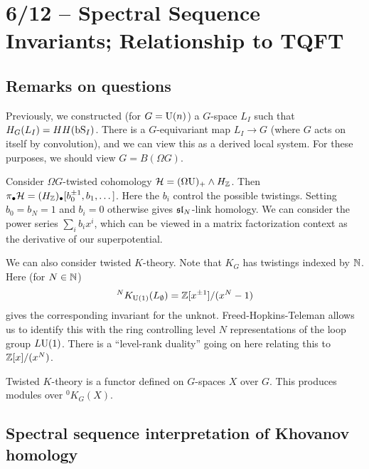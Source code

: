 \section{6/12 -- Spectral Sequence Invariants; Relationship to TQFT}

\subsection{Remarks on questions}

Previously, we constructed (for $G = \mathrm{U}(n)$) a $G$-space $L_I$ such that $H_G(L_I) = HH(\mathrm{bS}_I)$.
There is a $G$-equivariant map $L_I \to G$ (where $G$ acts on itself by convolution), and we can view this as a derived local system.
For these purposes, we should view $G = B(\Omega G)$.

\begin{ex}
	Consider $\Omega G$-twisted cohomology $\mathcal{H} = (\Omega \mathrm{U})_+ \wedge H_{\mathbb{Z}}$.
	Then $\pi_\bullet \mathcal{H} = (H_{\mathbb{Z}})_\bullet [b_0^{\pm 1}, b_1, \dots]$.
	Here the $b_i$ control the possible twistings.
	Setting $b_0 = b_N = 1$ and $b_i = 0$ otherwise gives $\mathfrak{sl}_N$-link homology.
	We can consider the power series $\sum_i b_i x^i$, which can be viewed in a matrix factorization context as the derivative of our superpotential.
\end{ex}

\begin{ex}
	We can also consider twisted $K$-theory.
	Note that $K_G$ has twistings indexed by $\mathbb{N}$.
	Here (for $N \in \mathbb{N}$)
	\[
		{}^N K_{\mathrm{U}(1)}(L_\emptyset) = \mathbb{Z}[x^{\pm 1}] / (x^N - 1)
	\]
	gives the corresponding invariant for the unknot.
	Freed-Hopkins-Teleman allows us to identify this with the ring controlling level $N$ representations of the loop group $L\mathrm{U}(1)$.
	There is a ``level-rank duality'' going on here relating this to $\mathbb{Z}[x] / (x^N)$.
\end{ex}

Twisted $K$-theory is a functor defined on $G$-spaces $X$ over $G$.
This produces modules over ${}^0 K_G(X)$.

\subsection{Spectral sequence interpretation of Khovanov homology}

